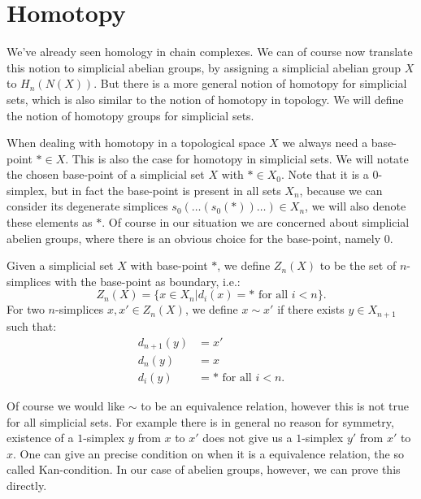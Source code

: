 \section{Homotopy}
\label{sec:Homotopy}

We've already seen homology in chain complexes. We can of course now translate this notion to simplicial abelian groups, by assigning a simplicial abelian group $X$ to $H_n(N(X))$. But there is a more general notion of homotopy for simplicial sets, which is also similar to the notion of homotopy in topology. We will define the notion of homotopy groups for simplicial sets.

When dealing with homotopy in a topological space $X$ we always need a base-point $\ast \in X$. This is also the case for homotopy in simplicial sets. We will notate the chosen base-point of a simplicial set $X$ with $\ast \in X_0$. Note that it is a $0$-simplex, but in fact the base-point is present in all sets $X_n$, because we can consider its degenerate simplices $s_0(\ldots(s_0(\ast))\ldots) \in X_n$, we will also denote these elements as $\ast$. Of course in our situation we are concerned about simplicial abelien groups, where there is an obvious choice for the base-point, namely $0$.


\begin{definition}
	Given a simplicial set $X$ with base-point $\ast$, we define $Z_n(X)$ to be the set of $n$-simplices with the base-point as boundary, i.e.:
	$$ Z_n(X) = \{ x \in X_n | d_i(x) = \ast \text{ for all } i < n \}. $$
	For two $n$-simplices $x, x' \in Z_n(X)$, we define $x \sim x'$ if there exists $y \in X_{n+1}$ such that:
	\begin{align}
		d_{n+1}(y) &= x' \\
		d_n(y) &= x \\
		d_i(y) &= \ast \text{ for all } i < n.
	\end{align}
\end{definition}

Of course we would like $\sim$ to be an equivalence relation, however this is not true for all simplicial sets. For example there is in general no reason for symmetry, existence of a $1$-simplex $y$ from $x$ to $x'$ does not give us a $1$-simplex $y'$ from $x'$ to $x$. One can give an precise condition on when it is a equivalence relation, the so called Kan-condition. In our case of abelien groups, however, we can prove this directly.

